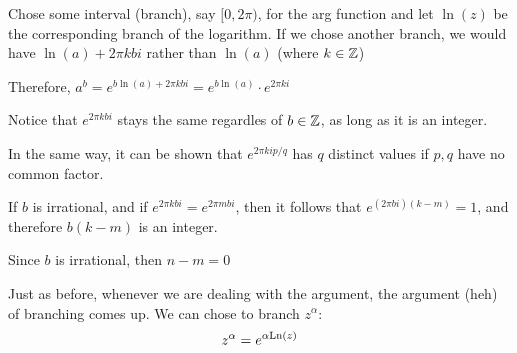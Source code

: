\par\bigskip
\begin{prf}[]{}
  Chose some interval (branch), say $[0,2\pi)$, for the arg function and let $\ln{\left(z\right)}$  be the corresponding branch of the logarithm. If we chose another branch, we would have $\ln{\left(a\right)}+2\pi kbi$ rather than $\ln{\left(a\right)}$ (where $k\in\mathbb{Z}$)\par
  \noindent Therefore, $a^b = e^{b\ln{\left(a\right)}+2\pi kbi} = e^{b\ln{\left(a\right)}}\cdot e^{2\pi ki}$
  \par\bigskip
  \noindent Notice that $e^{2\pi kbi}$ stays the same regardles of $b\in\mathbb{Z}$, as long as it is an integer.
  \par\bigskip
  \noindent In the same way, it can be shown that $e^{2\pi kip/q}$ has $q$ distinct values if $p,q$ have no common factor.
  \par\bigskip
  \noindent If $b$ is irrational, and if $e^{2\pi kbi} = e^{2\pi mbi}$, then it follows that $e^{(2\pi bi)(k-m)} =1$, and therefore $b(k-m)$ is an integer.\par
  \noindent Since $b$ is irrational, then $n-m = 0$
\end{prf}
\par\bigskip
\noindent Just as before, whenever we are dealing with the argument, the argument (heh) of branching comes up. We can chose to branch $z^\alpha$:
\begin{equation*}
  \begin{gathered}
    z^\alpha = e^{\alpha\text{Ln}\left(z\right)}
  \end{gathered}
\end{equation*}
\par\bigskip
